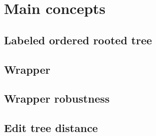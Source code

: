 \chapter{Main concepts}


\section{Labeled ordered rooted tree}
\section{Wrapper}
\section{Wrapper robustness}
\section{Edit tree distance}


